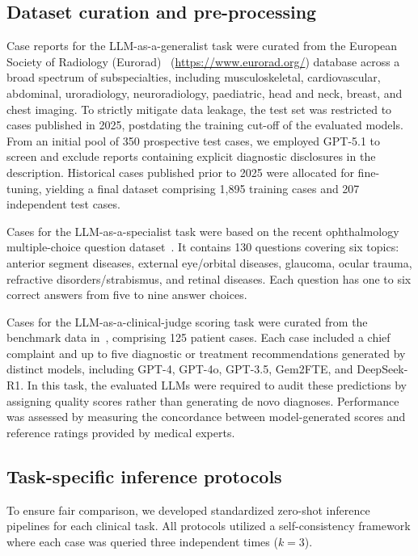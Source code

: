 \documentclass[10pt,journal,compsoc, onecolumn]{IEEEtran}
\begin{document}
\subsection*{Dataset curation and pre-processing}
Case reports for the LLM-as-a-generalist task were curated from the European Society of Radiology (Eurorad)~\cite{kottlors2025eurorad}  (\url{https://www.eurorad.org/}) database across a broad spectrum of subspecialties, including musculoskeletal, cardiovascular, abdominal, uroradiology, neuroradiology, paediatric, head and neck, breast, and chest imaging.
To strictly mitigate data leakage, the test set was restricted to cases published in 2025, postdating the training cut-off of the evaluated models. From an initial pool of 350 prospective test cases, we employed GPT-5.1 to screen and exclude reports containing explicit diagnostic disclosures in the description. Historical cases published prior to 2025 were allocated for fine-tuning, yielding a final dataset comprising 1,895 training cases and 207 independent test cases.

Cases for the LLM-as-a-specialist task were based on the recent ophthalmology multiple-choice question dataset~\cite{ophthalmologyQA}. It contains 130 questions covering six topics: anterior segment diseases, external eye/orbital diseases, glaucoma, ocular trauma, refractive disorders/strabismus, and retinal diseases. Each question has one to six correct answers from five to nine answer choices.

Cases for the LLM-as-a-clinical-judge scoring task were curated from the benchmark data in~\cite{eval-deepseek125Patients}, comprising 125 patient cases. 
Each case included a chief complaint and up to five diagnostic or treatment recommendations generated by distinct models, including GPT-4, GPT-4o, GPT-3.5, Gem2FTE, and DeepSeek-R1. In this task, the evaluated LLMs were required to audit these predictions by assigning quality scores rather than generating de novo diagnoses. Performance was assessed by measuring the concordance between model-generated scores and reference ratings provided by medical experts.

\subsection*{Task-specific inference protocols}

To ensure fair comparison, we developed standardized zero-shot inference pipelines for each clinical task. All protocols utilized a self-consistency framework where each case was queried three independent times (\(k = 3\)).
\end{document}
